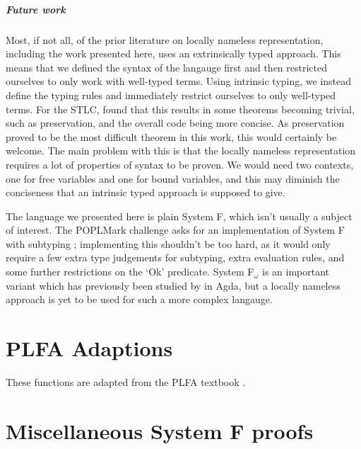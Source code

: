 \documentclass[logo,bsc,singlespacing,parskip,online]{infthesis}
\begin{document}
\paragraph*{Future work} Most, if not all, of the prior literature on locally nameless
representation, including the work presented here, uses an extrinsically typed approach. This means
that we defined the syntax of the langauge first and then restricted ourselves to only work with
well-typed terms. Using intrinsic typing, we instead define the typing rules and immediately
restrict ourselves to only well-typed terms. For the STLC,
\citet[chapter~De~Bruijn]{wadler_programming_2022} found that this results in some theorems becoming
trivial, such as preservation, and the overall code being more concise. As preservation proved to be
the most difficult theorem in this work, this would certainly be welcome. The main problem with this
is that the locally nameless representation requires a lot of properties of syntax to be proven. We
would need two contexts, one for free variables and one for bound variables, and this may diminish
the conciseness that an intrinsic typed approach is supposed to give.

The language we presented here is plain System F, which isn't usually a subject of interest. The
POPLMark challenge asks for an implementation of System F with subtyping
\citep{chargueraud_locally_2012}; implementing this shouldn't be too hard, as it would only require
a few extra type judgements for subtyping, extra evaluation rules, and some further restrictions on
the `Ok' predicate. System F$_\omega$ is an important variant which has previously been studied by
\citet{hutton_system_2019} in Agda, but a locally nameless approach is yet to be used for such a
more complex langauge.




\appendix

\chapter{PLFA Adaptions}
\label{appendix:plfa}

These functions are adapted from the PLFA textbook \citep{wadler_programming_2022}.



\chapter{Miscellaneous System F proofs}
\end{document}
